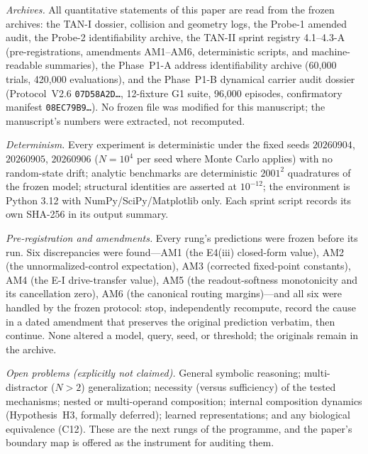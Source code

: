 \emph{Archives.} All quantitative statements of this paper are read from
the frozen archives: the TAN-I dossier, collision and geometry logs, the
Probe-1 amended audit, the Probe-2 identifiability archive, the TAN-II
sprint registry 4.1--4.3-A (pre-registrations, amendments AM1--AM6,
deterministic scripts, and machine-readable summaries), the Phase~P1-A
address identifiability archive (60,000 trials, 420,000 evaluations),
and the Phase~P1-B dynamical carrier audit dossier (Protocol~V2.6
\texttt{07D58A2D\dots}, 12-fixture G1 suite, 96,000 episodes, confirmatory manifest
\texttt{08EC79B9\dots}). No frozen file was modified for this manuscript; the manuscript's numbers were extracted, not recomputed.

\emph{Determinism.} Every experiment is deterministic under the fixed
seeds $20260904$, $20260905$, $20260906$ ($N=10^4$ per seed where Monte
Carlo applies) with no random-state drift; analytic benchmarks are
deterministic $2001^2$ quadratures of the frozen model; structural
identities are asserted at $10^{-12}$; the environment is Python 3.12
with NumPy/SciPy/Matplotlib only. Each sprint script records its own
SHA-256 in its output summary.

\emph{Pre-registration and amendments.} Every rung's predictions were
frozen before its run. Six discrepancies were found---AM1 (the E4(iii)
closed-form value), AM2 (the unnormalized-control expectation), AM3
(corrected fixed-point constants), AM4 (the E-I drive-transfer value),
AM5 (the readout-softness monotonicity and its cancellation zero), AM6
(the canonical routing margins)---and all six were handled by the frozen
protocol: stop, independently recompute, record the cause in a dated
amendment that preserves the original prediction verbatim, then continue.
None altered a model, query, seed, or threshold; the originals remain in
the archive.

\emph{Open problems (explicitly not claimed).} General symbolic
reasoning; multi-distractor ($N>2$) generalization; necessity (versus
sufficiency) of the tested mechanisms; nested or multi-operand
composition; internal composition dynamics (Hypothesis~H3, formally deferred);
learned representations; and any biological equivalence (C12). These are the
next rungs of the programme, and the paper's boundary map is offered as the
instrument for auditing them.
